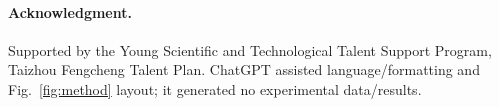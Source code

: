 \documentclass[10pt]{article}
\begin{document}
\paragraph{Acknowledgment.}
Supported by the Young Scientific and Technological Talent Support Program,
Taizhou Fengcheng Talent Plan. ChatGPT assisted language/formatting and
Fig.~\ref{fig:method} layout; it generated no experimental data/results.

\clearpage
\balance


\end{document}

